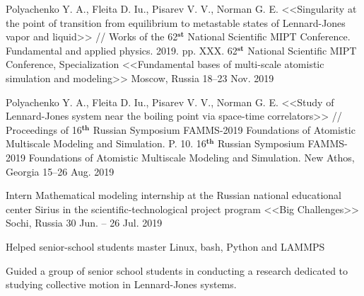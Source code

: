 

\begin{cventries}


  \cventry
    {Polyachenko Y. A., Fleita D. Iu., Pisarev V. V., Norman G. E. <<Singularity at the point of transition from equilibrium to metastable states of Lennard-Jones vapor and liquid>> // Works of the 62$^{\textbf{st}}$ National Scientific MIPT Conference. Fundamental and applied physics. 2019. pp. XXX.} %
    {62$^{\textbf{st}}$ National Scientific MIPT Conference, Specialization <<Fundamental bases of multi-scale atomistic simulation and modeling>>} %
    {Moscow, Russia} %
    {18--23 Nov. 2019} %
    {
      \begin{cvitems} %
      \end{cvitems}
    }


  \cventry
    {Polyachenko Y. A., Fleita D. Iu., Pisarev V. V., Norman G. E. <<Study of Lennard-Jones system near the boiling point via space-time correlators>> // Proceedings of 16$^{\textbf{th}}$ Russian Symposium FAMMS-2019 Foundations of Atomistic Multiscale Modeling and Simulation. P. 10.} %
    {16$^{\textbf{th}}$ Russian Symposium FAMMS-2019 Foundations of Atomistic Multiscale Modeling and Simulation.} %
    {New Athos, Georgia} %
    {15--26 Aug. 2019} %
    {
      \begin{cvitems} %
      \end{cvitems}
    }
    
  \cventry
    {Intern} %
    {Mathematical modeling internship at the Russian national educational center Sirius in the scientific-technological project program <<Big Challenges>>} %
    {Sochi, Russia} %
    {30 Jun. -- 26 Jul. 2019} %
    {
      \begin{cvitems} %
        \item {Helped senior-school students master Linux, bash, Python and LAMMPS}
        \item {Guided a group of senior school students in conducting a research dedicated to studying collective motion in Lennard-Jones systems.}
      \end{cvitems}
    }


\end{cventries}
